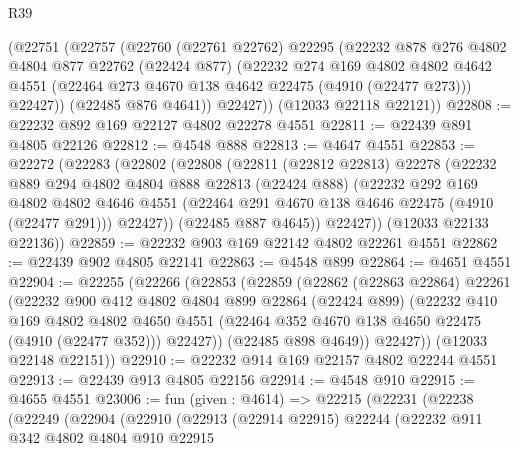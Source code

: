 \begin{lexlean}{R39}
\begin{coremodule}
      (@22751
        (@22757
          (@22760
            (@22761 @22762)
            @22295
            (@22232
              @878
              @276
              @4802
              @4804
              @877
              @22762
              (@22424 @877)
              (@22232
                @274
                @169
                @4802
                @4802
                @4642
                @4551
                (@22464 @273 @4670 @138 @4642 @22475 (@4910 (@22477 @273)))
                @22427))
            (@22485 @876 @4641))
          @22427))
      (@12033 @22118 @22121))
@22808 := @22232 @892 @169 @22127 @4802 @22278 @4551
@22811 := @22439 @891 @4805 @22126
@22812 := @4548 @888
@22813 := @4647 @4551
@22853 := @22272
    (@22283
      (@22802
        (@22808
          (@22811
            (@22812 @22813)
            @22278
            (@22232
              @889
              @294
              @4802
              @4804
              @888
              @22813
              (@22424 @888)
              (@22232
                @292
                @169
                @4802
                @4802
                @4646
                @4551
                (@22464 @291 @4670 @138 @4646 @22475 (@4910 (@22477 @291)))
                @22427))
            (@22485 @887 @4645))
          @22427))
      (@12033 @22133 @22136))
@22859 := @22232 @903 @169 @22142 @4802 @22261 @4551
@22862 := @22439 @902 @4805 @22141
@22863 := @4548 @899
@22864 := @4651 @4551
@22904 := @22255
    (@22266
      (@22853
        (@22859
          (@22862
            (@22863 @22864)
            @22261
            (@22232
              @900
              @412
              @4802
              @4804
              @899
              @22864
              (@22424 @899)
              (@22232
                @410
                @169
                @4802
                @4802
                @4650
                @4551
                (@22464 @352 @4670 @138 @4650 @22475 (@4910 (@22477 @352)))
                @22427))
            (@22485 @898 @4649))
          @22427))
      (@12033 @22148 @22151))
@22910 := @22232 @914 @169 @22157 @4802 @22244 @4551
@22913 := @22439 @913 @4805 @22156
@22914 := @4548 @910
@22915 := @4655 @4551
@23006 := fun (given : @4614) =>
  @22215
    (@22231
      (@22238
        (@22249
          (@22904
            (@22910
              (@22913
                (@22914 @22915)
                @22244
                (@22232
                  @911
                  @342
                  @4802
                  @4804
                  @910
                  @22915

\end{coremodule}
\end{lexlean}
